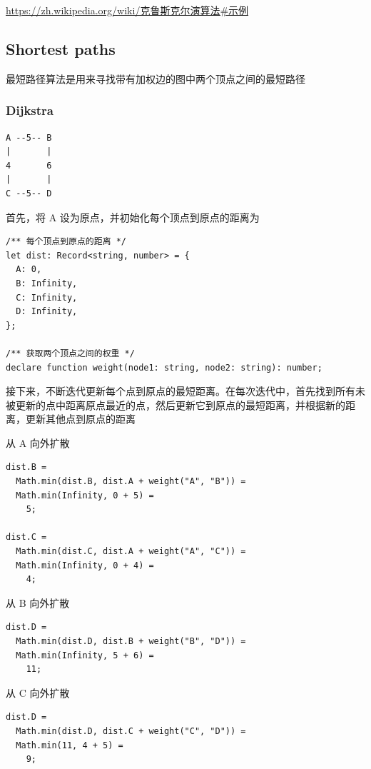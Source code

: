 \documentclass[11pt,journal,compsoc]{IEEEtran}
\begin{document}
\url{https://zh.wikipedia.org/wiki/克鲁斯克尔演算法#示例}


\subsection{Shortest paths}

最短路径算法是用来寻找带有加权边的图中两个顶点之间的最短路径


\subsubsection{Dijkstra}

\begin{verbatim}
A --5-- B
|       |
4       6
|       |
C --5-- D
\end{verbatim}

首先，将 A 设为原点，并初始化每个顶点到原点的距离为 \infty

\begin{verbatim}
/** 每个顶点到原点的距离 */
let dist: Record<string, number> = {
  A: 0,
  B: Infinity,
  C: Infinity,
  D: Infinity,
};

/** 获取两个顶点之间的权重 */
declare function weight(node1: string, node2: string): number;
\end{verbatim}

接下来，不断迭代更新每个点到原点的最短距离。在每次迭代中，首先找到所有未被更新的点中距离原点最近的点，然后更新它到原点的最短距离，并根据新的距离，更新其他点到原点的距离

从 A 向外扩散

\begin{verbatim}
dist.B =
  Math.min(dist.B, dist.A + weight("A", "B")) =
  Math.min(Infinity, 0 + 5) =
    5;

dist.C =
  Math.min(dist.C, dist.A + weight("A", "C")) =
  Math.min(Infinity, 0 + 4) =
    4;
\end{verbatim}

从 B 向外扩散

\begin{verbatim}
dist.D =
  Math.min(dist.D, dist.B + weight("B", "D")) =
  Math.min(Infinity, 5 + 6) =
    11;
\end{verbatim}

从 C 向外扩散

\begin{verbatim}
dist.D = 
  Math.min(dist.D, dist.C + weight("C", "D")) = 
  Math.min(11, 4 + 5) = 
    9;
\end{verbatim}
\end{document}
